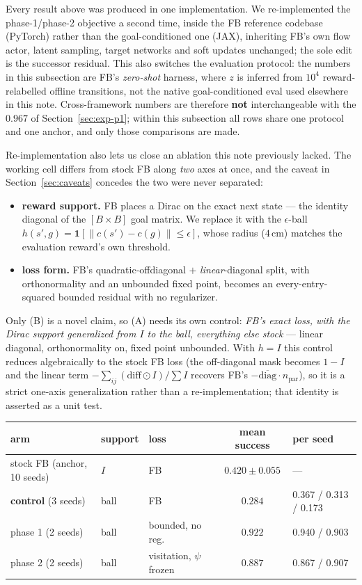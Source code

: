 \documentclass[10pt]{article}
\newcommand{\ind}[1]{\mathbf{1}\!\left[#1\right]}
\begin{document}
Every result above was produced in one implementation. We re-implemented the
phase-1/phase-2 objective a second time, inside the FB reference codebase
(PyTorch) rather than the goal-conditioned one (JAX), inheriting FB's own flow
actor, latent sampling, target networks and soft updates unchanged; the sole
edit is the successor residual. This also switches the evaluation protocol: the
numbers in this subsection are FB's \emph{zero-shot} harness, where $z$ is
inferred from $10^4$ reward-relabelled offline transitions, not the native
goal-conditioned eval used elsewhere in this note. Cross-framework numbers are
therefore \textbf{not} interchangeable with the $0.967$ of
Section~\ref{sec:exp-p1}; within this subsection all rows share one protocol and
one anchor, and only those comparisons are made.

Re-implementation also lets us close an ablation this note previously lacked.
The working cell differs from stock FB along \emph{two} axes at once, and the
caveat in Section~\ref{sec:caveats} concedes the two were never separated:

\begin{itemize}\itemsep2pt
\item[(A)] \textbf{reward support.} FB places a Dirac on the exact next state
--- the identity diagonal of the $[B\!\times\!B]$ goal matrix. We replace it
with the $\epsilon$-ball $h(s',g)=\ind{\lVert c(s')-c(g)\rVert\le\epsilon}$,
whose radius ($4$\,cm) matches the evaluation reward's own threshold.
\item[(B)] \textbf{loss form.} FB's quadratic-offdiagonal $+$ \emph{linear}-diagonal
split, with orthonormality and an unbounded fixed point, becomes an
every-entry-squared bounded residual with no regularizer.
\end{itemize}

Only (B) is a novel claim, so (A) needs its own control: \emph{FB's exact loss,
with the Dirac support generalized from $I$ to the ball, everything else stock}
--- linear diagonal, orthonormality on, fixed point unbounded. With $h=I$ this
control reduces algebraically to the stock FB loss (the off-diagonal mask
becomes $1-I$ and the linear term $-\sum_{ij}(\text{diff}\odot I)/\!\sum I$
recovers FB's $-\overline{\mathrm{diag}}\cdot n_{\text{par}}$), so it is a
strict one-axis generalization rather than a re-implementation; that identity is
asserted as a unit test.

\begin{center}
\small
\begin{tabular}{l l l c l}
\toprule
arm & support & loss & mean success & per seed \\
\midrule
stock FB (anchor, 10 seeds) & $I$ & FB & $0.420 \pm 0.055$ & --- \\
\textbf{control} (3 seeds)  & ball & FB & $0.284$ & 0.367 / 0.313 / 0.173 \\
phase 1 (2 seeds)           & ball & bounded, no reg. & $\mathbf{0.922}$ & 0.940 / 0.903 \\
phase 2 (2 seeds)           & ball & visitation, $\psi$ frozen & $0.887$ & 0.867 / 0.907 \\
\bottomrule
\end{tabular}
\end{center}
\end{document}

